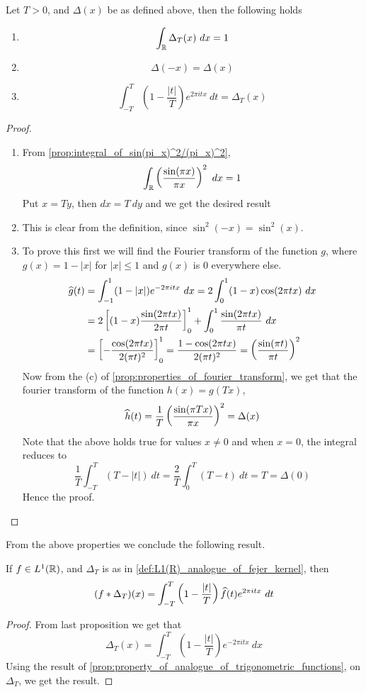 \begin{proposition}
  \label{prop:properties_of_fejer_kernel_in_R}
  Let $T>0$, and $\Delta(x)$ be as defined above, then the following holds 
  \begin{enumerate}[label=(\alph*)]
    \item $$\int_\mathbb R \Delta_T(x) \ dx = 1$$
    \item $$\Delta(-x) = \Delta(x)$$
    \item $$\int_{-T}^T \left(1-\frac{|t|}{T}\right) e^{2\pi itx} \ dt = \Delta_T(x)$$
  \end{enumerate}
\end{proposition}
\begin{proof}
  \begin{enumerate}[label=(\alph*)]
    \item  
      From \autoref{prop:integral_of_sin(pi_x)^2/(pi_x)^2}, $$\int_\mathbb R \left(\frac{\sin(\pi x)}{\pi x}\right)^2 \ dx = 1$$
      Put $x=Ty$, then $dx = T \ dy $ and we get the desired result

    \item This is clear from the definition, since $\sin^2(-x) = \sin^2(x)$.
    \item To prove this first we will find the Fourier transform of the function $g$, where $g(x) = 1 - |x|$ for $|x| \le 1$ and $g(x)$ is 0 everywhere else.
     \begin{align*}
       \widehat{g}(t) &= \int_{-1}^1 (1-|x|)e^{-2 \pi itx} \ dx = 2\int_0^1(1-x)\cos(2\pi tx) \ dx \\
       &= 2\left[(1-x)\frac{\sin(2\pi tx)}{2\pi t} \right]_0^1 + \int_0^1\frac{\sin(2\pi tx)}{\pi t} \ dx \\
       &= \left[-\frac{\cos(2\pi tx)}{2(\pi t)^2}\right]_0^1 = \frac{1 - \cos(2\pi tx)}{2(\pi t)^2} = \left(\frac{\sin(\pi t)}{\pi t}\right)^2
     \end{align*}
      Now from the (c) of \autoref{prop:properties_of_fourier_transform}, we get that the fourier transform of the function $h(x) = g(Tx)$, $$\widehat{h}(t) = \frac{1}{T}\left(\frac{\sin(\pi Tx)}{\pi x}\right)^2 = \Delta(x)$$
      Note that the above holds true for values $x\neq 0$ and when $x=0$, the integral reduces to $$\frac{1}{T}\int_{-T}^T (T-|t|) \ dt =  \frac{2}{T}\int_0^T(T-t) \ dt = T = \Delta(0)$$
    Hence the proof.
  \end{enumerate}
\end{proof}

From the above properties we conclude the following result. 
\begin{corollary}
  \label{cor:convolution_with_fejer_kernel_in_L1(R)}
  If $f\in L^1(\mathbb R)$, and $\Delta_T$ is as in \autoref{def:L1(R)_analogue_of_fejer_kernel}, then $$(f*\Delta_T)(x) = \int_{-T}^T \left(1-\frac{|t|}{T}\right)\widehat{f}(t)e^{2\pi itx} \ dt$$
\end{corollary}
\begin{proof}
  From last proposition we get that $$\Delta_T(x) = \int_{-T}^T \left(1-\frac{|t|}{T}\right)e^{-2 \pi itx} \ dx$$
  Using the result of \autoref{prop:property_of_analogue_of_trigonometric_functions}, on $\Delta_T$, we get the result.
\end{proof}

